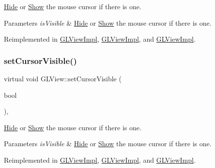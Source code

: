 \hyperlink{classHide}{Hide} or \hyperlink{classShow}{Show} the mouse cursor if there is one.


\begin{DoxyParams}{Parameters}
{\em is\+Visible} & \hyperlink{classHide}{Hide} or \hyperlink{classShow}{Show} the mouse cursor if there is one. \\
\hline
\end{DoxyParams}


Reimplemented in \hyperlink{classGLViewImpl_a7e609efc4d34d98544b42e5f18ff29b8}{G\+L\+View\+Impl}, \hyperlink{classGLViewImpl_a6a90e8743caf5fff31f0502dc44c986d}{G\+L\+View\+Impl}, and \hyperlink{classGLViewImpl_a7e609efc4d34d98544b42e5f18ff29b8}{G\+L\+View\+Impl}.

\mbox{\label{classGLView_afa971ce0119e72731a7ff42443d3e90d}} 
\subsubsection{\texorpdfstring{set\+Cursor\+Visible()}{setCursorVisible()}\hspace{0.1cm}{\footnotesize\ttfamily [2/2]}}
{\footnotesize\ttfamily virtual void G\+L\+View\+::set\+Cursor\+Visible (\begin{DoxyParamCaption}\item[{bool}]{ }\end{DoxyParamCaption})\hspace{0.3cm}{\ttfamily [inline]}, {\ttfamily [virtual]}}

\hyperlink{classHide}{Hide} or \hyperlink{classShow}{Show} the mouse cursor if there is one.


\begin{DoxyParams}{Parameters}
{\em is\+Visible} & \hyperlink{classHide}{Hide} or \hyperlink{classShow}{Show} the mouse cursor if there is one. \\
\hline
\end{DoxyParams}


Reimplemented in \hyperlink{classGLViewImpl_a7e609efc4d34d98544b42e5f18ff29b8}{G\+L\+View\+Impl}, \hyperlink{classGLViewImpl_a6a90e8743caf5fff31f0502dc44c986d}{G\+L\+View\+Impl}, and \hyperlink{classGLViewImpl_a7e609efc4d34d98544b42e5f18ff29b8}{G\+L\+View\+Impl}.

\mbox{\label{classGLView_a527977ed54ff5ae4ca8a3e2e7a541551}} 
